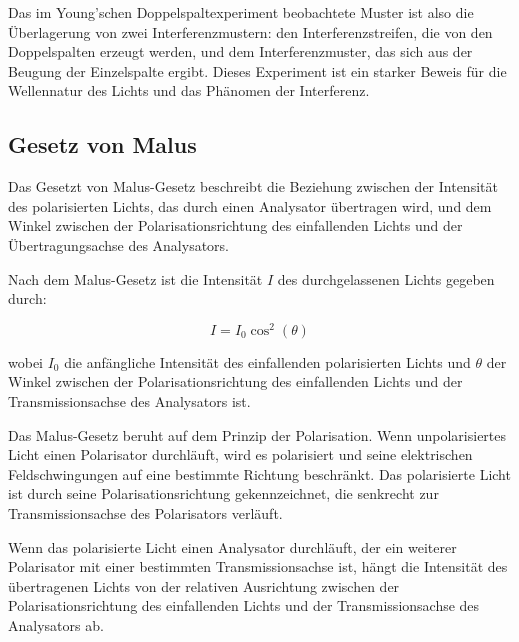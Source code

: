 \documentclass[12pt,english,ngerman]{scrartcl}
\begin{document}
Das im Young'schen Doppelspaltexperiment beobachtete Muster ist also die
Überlagerung von zwei Interferenzmustern: den Interferenzstreifen, die von den
Doppelspalten erzeugt werden, und dem Interferenzmuster, das sich aus der
Beugung der Einzelspalte ergibt. Dieses Experiment ist ein starker Beweis für
die Wellennatur des Lichts und das Phänomen der Interferenz.

\subsection{Gesetz von Malus}

Das Gesetzt von Malus-Gesetz beschreibt die Beziehung zwischen der Intensität
des polarisierten Lichts, das durch einen Analysator übertragen wird, und dem
Winkel zwischen der Polarisationsrichtung des einfallenden Lichts und der
Übertragungsachse des Analysators.

Nach dem Malus-Gesetz ist die Intensität $I$ des durchgelassenen Lichts gegeben
durch:

\begin{equation}
	I = I_0  \cos^2(\theta)
	\label{eq:MalusGesetzt}
\end{equation}

wobei $I_0$ die anfängliche Intensität des einfallenden polarisierten Lichts
und $\theta$ der Winkel zwischen der Polarisationsrichtung des einfallenden
Lichts und der Transmissionsachse des Analysators ist.

Das Malus-Gesetz beruht auf dem Prinzip der Polarisation. Wenn unpolarisiertes
Licht einen Polarisator durchläuft, wird es polarisiert und seine elektrischen
Feldschwingungen auf eine bestimmte Richtung beschränkt. Das polarisierte Licht
ist durch seine Polarisationsrichtung gekennzeichnet, die senkrecht zur
Transmissionsachse des Polarisators verläuft.

Wenn das polarisierte Licht einen Analysator durchläuft, der ein weiterer
Polarisator mit einer bestimmten Transmissionsachse ist, hängt die Intensität
des übertragenen Lichts von der relativen Ausrichtung zwischen der
Polarisationsrichtung des einfallenden Lichts und der Transmissionsachse des
Analysators ab.

\end{document}
